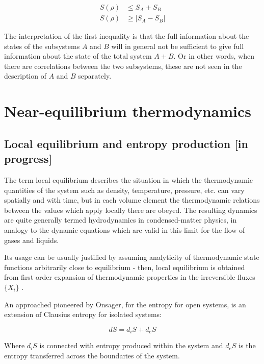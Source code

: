 \documentclass[a4paper,12pt]{article}
\begin{document}
\begin{equation}
\begin{aligned}
	S(\rho) &\leq S_A + S_B	\\
	S(\rho) &\geq \left| S_A - S_B \right|
\end{aligned}
\end{equation}

The interpretation of the first inequality is that the full information about the states of the subsystems $A$ and $B$ will in general not be sufficient to give full information about the state of the total system $A+B$. Or in other words, when there are correlations between the two subsystems, these are not seen in the description of $A$ and $B$ separately. 

\section{Near-equilibrium thermodynamics}
\subsection{Local equilibrium and entropy production [in progress]}

The term local equilibrium describes the situation in which the thermodynamic quantities of the system such as density, temperature, pressure, etc. can vary spatially and with time, but in each volume element the thermodynamic relations between the values which apply locally there are obeyed. The resulting dynamics are quite generally termed hydrodynamics in condensed-matter physics, in analogy to the dynamic equations which are valid in this limit for the flow of gases and liquids. 

Its usage can be usually justified by assuming analyticity of thermodynamic state functions arbitrarily close to equilibrium - then, local equilibrium is obtained from first order expansion of thermodynamic properties in the irreversible fluxes $\{X_i\}$ \cite{Evans:2002gg}.


An approached pioneered by Onsager, for the entropy for open systems, is an extension of Clausius entropy for isolated systems:

\begin{equation}
  	dS=d_iS+d_eS
\end{equation}

Where $d_iS$ is connected with entropy produced within the system and $d_eS$ is the entropy transferred across the boundaries of the system.
\end{document}
